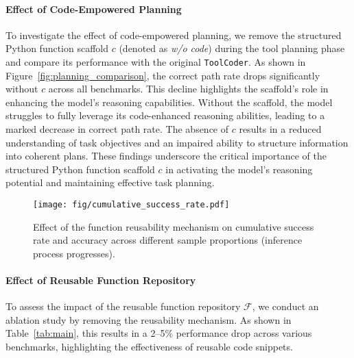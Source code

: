 \paragraph{Effect of Code-Empowered Planning}  
To investigate the effect of code-empowered planning, we remove the structured Python function scaffold $c$ (denoted as \textit{w/o code}) during the tool planning phase and compare its performance with the original \texttt{ToolCoder}. As shown in Figure~\ref{fig:planning_comparison}, the correct path rate drops significantly without $c$ across all benchmarks. This decline highlights the scaffold's role in enhancing the model's reasoning capabilities. Without the scaffold, the model struggles to fully leverage its code-enhanced reasoning abilities, leading to a marked decrease in correct path rate. The absence of $c$ results in a reduced understanding of task objectives and an impaired ability to structure information into coherent plans. These findings underscore the critical importance of the structured Python function scaffold $c$ in activating the model's reasoning potential and maintaining effective task planning.

\begin{figure}[t]
    \centering
    \texttt{[image: fig/cumulative\_success\_rate.pdf]}
    \caption{Effect of the function reusability mechanism on cumulative success rate and accuracy across different sample proportions (inference process progresses).}
    \label{fig:cumulative_success_rate}
    \vspace{-0.5cm}
\end{figure}

\paragraph{Effect of Reusable Function Repository}
To assess the impact of the reusable function repository $\mathcal{F}$, we conduct an ablation study by removing the reusability mechanism. As shown in Table~\ref{tab:main}, this results in a 2–5\% performance drop across various benchmarks, highlighting the effectiveness of reusable code snippets.


